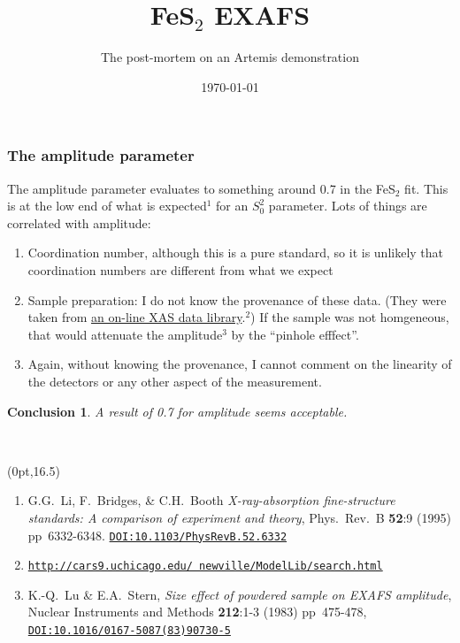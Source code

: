 \documentclass[10pt, xcolor=x11names, compress, handout]{beamer}
\title{FeS$_2$ EXAFS}%
\subtitle{The post-mortem on an Artemis demonstration}
\date{\today}
\newcommand{\fes}{FeS$_2$}
\newtheorem{conclusion}[theorem]{Conclusion}
\begin{document}
\maketitle


\begin{frame}
  \frametitle{The amplitude parameter}
  \small%
  The amplitude parameter evaluates to something around 0.7 in the
  {\fes} fit.  This is at the low end of what is expected$^1$ for an
  $S_0^2$ parameter.  Lots of things are correlated with amplitude:
  \begin{enumerate}
  \item Coordination number, although this is a pure standard, so it
    is unlikely that coordination numbers are different from what we
    expect
  \item Sample preparation: I do not know the provenance of these
    data.  (They were taken from
    \href{http://cars9.uchicago.edu/~newville/ModelLib/search.html}
    {\color{Blue4}an on-line XAS data library}.$^2$) If the sample was
    not homgeneous, that would attenuate the amplitude$^3$ by the
    ``pinhole efffect''.
  \item Again, without knowing the provenance, I cannot comment on the
    linearity of the detectors or any other aspect of the measurement.
  \end{enumerate}

  \begin{conclusion}
    A result of 0.7 for amplitude seems acceptable.
  \end{conclusion}

  \medskip

  ~

  \begin{textblock*}{0.9\linewidth}(0pt,16.5\TPVertModule)%
    \begin{enumerate}[1.]
    \tiny%
    \item G.G.\ Li, F.\ Bridges, \& C.H.\ Booth \textit{X-ray-absorption
      fine-structure standards: A comparison of experiment and
      theory}, Phys.\ Rev.\ B \textbf{52}:9 (1995) pp\ 6332-6348.
    \href{http://dx.doi.org/10.1103/PhysRevB.52.6332}
    {\color{Blue4}\texttt{DOI:10.1103/PhysRevB.52.6332}}
  \item \href{http://cars9.uchicago.edu/~newville/ModelLib/search.html}
    {\color{Blue4}\texttt{http://cars9.uchicago.edu/~newville/ModelLib/search.html}}
  \item K.-Q.\ Lu \& E.A.\ Stern, \textit{Size effect of powdered
      sample on EXAFS amplitude}, Nuclear Instruments and Methods
    \textbf{212}:1-3 (1983) pp\ 475-478, 
    \href{http://dx.doi.org/10.1016/0167-5087(83)90730-5}
    {\color{Blue4}\texttt{DOI:10.1016/0167-5087(83)90730-5}}
  \end{enumerate}
\end{textblock*}
  
\end{frame}
\end{document}
